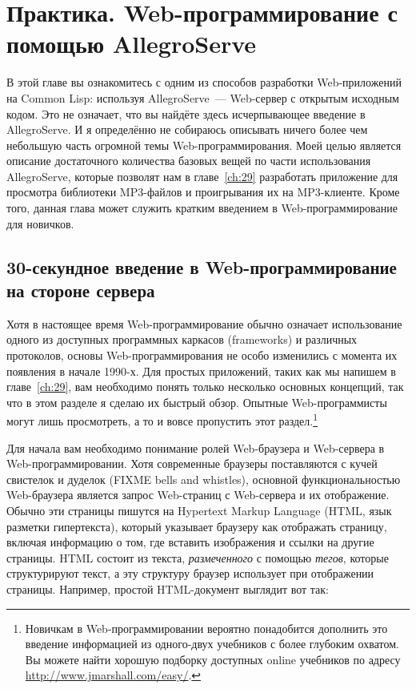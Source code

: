 \chapter{Практика. Web-программирование с помощью AllegroServe}
\label{ch:26}

В этой главе вы ознакомитесь с одним из способов разработки Web-приложений на Common Lisp:
используя AllegroServe~--- Web-сервер с открытым исходным кодом. Это не означает, что вы
найдёте здесь исчерпывающее введение в AllegroServe. И я определённо не собираюсь
описывать ничего более чем небольшую часть огромной темы Web-программирования. Моей целью
является описание достаточного количества базовых вещей по части использования
AllegroServe, которые позволят нам в главе~\ref{ch:29} разработать приложение для
просмотра библиотеки MP3-файлов и проигрывания их на MP3-клиенте. Кроме того, данная глава
может служить кратким введением в Web-программирование для новичков.

\section{30-секундное введение в Web-программирование на стороне сервера}

Хотя в настоящее время Web-программирование обычно означает использование одного из
доступных программных каркасов (frameworks) и различных протоколов, основы
Web-программирования не особо изменились с момента их появления в начале 1990-х. Для
простых приложений, таких как мы напишем в главе~\ref{ch:29}, вам необходимо понять только
несколько основных концепций, так что в этом разделе я сделаю их быстрый обзор. Опытные
Web-программисты могут лишь просмотреть, а то и вовсе пропустить этот
раздел.\footnote{Новичкам в Web-программировании вероятно понадобится дополнить это
  введение информацией из одного-двух учебников с более глубоким охватом. Вы можете найти
  хорошую подборку доступных online учебников по адресу
  \url{http://www.jmarshall.com/easy/}.}

Для начала вам необходимо понимание ролей Web-браузера и Web-сервера в
Web-программировании. Хотя современные браузеры поставляются с кучей свистелок и дуделок
(FIXME bells and whistles), основной функциональностью Web-браузера является запрос
Web-страниц с Web-сервера и их отображение. Обычно эти страницы пишутся на Hypertext
Markup Language (HTML, язык разметки гипертекста), который указывает браузеру как
отображать страницу, включая информацию о том, где вставить изображения и ссылки на другие
страницы. HTML состоит из текста, \textit{размеченного} с помощью \textit{тегов}, которые
структурируют текст, а эту структуру браузер использует при отображении
страницы. Например, простой HTML-документ выглядит вот так:

